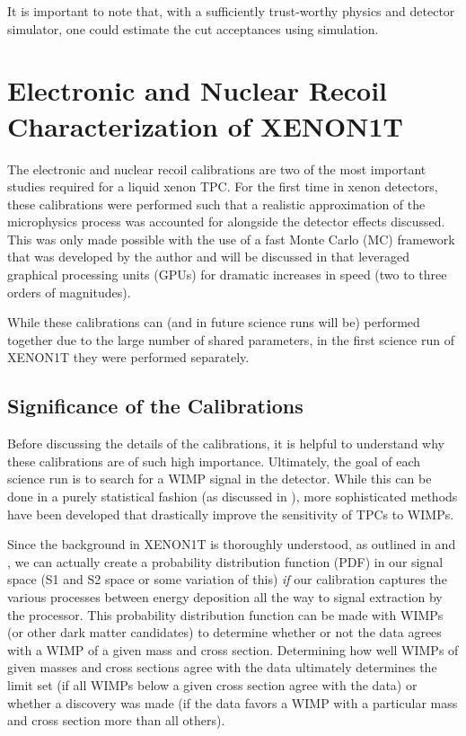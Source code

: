 It is important to note that, with a sufficiently trust-worthy physics and detector simulator, one could estimate the cut acceptances using simulation. 




\section{Electronic and Nuclear Recoil Characterization of XENON1T}
\label{sec:xe1t_er_nr_calibration}

The electronic and nuclear recoil calibrations are two of the most important studies required for a liquid xenon TPC.  For the first time in xenon detectors, these calibrations were performed such that a realistic approximation of the microphysics process was accounted for alongside the detector effects discussed.  This was only made possible with the use of a fast Monte Carlo (MC) framework that was developed by the author and will be discussed in  that leveraged graphical processing units (GPUs) for dramatic increases in speed (two to three orders of magnitudes).

While these calibrations can (and in future science runs will be) performed together due to the large number of shared parameters, in the first science run of XENON1T they were performed separately.  


\subsection{Significance of the Calibrations}

Before discussing the details of the calibrations, it is helpful to understand why these calibrations are of such high importance.  Ultimately, the goal of each science run is to search for a WIMP signal in the detector.  While this can be done in a purely statistical fashion (as discussed in ), more sophisticated methods have been developed that drastically improve the sensitivity of TPCs to WIMPs.  

Since the background in XENON1T is thoroughly understood, as outlined in  and , we can actually create a probability distribution function (PDF) in our signal space (S1 and S2 space or some variation of this) \textit{if} our calibration captures the various processes between energy deposition all the way to signal extraction by the processor.  This probability distribution function can be made with WIMPs (or other dark matter candidates) to determine whether or not the data agrees with a WIMP of a given mass and cross section.  Determining how well WIMPs of given masses and cross sections agree with the data ultimately determines the limit set (if all WIMPs below a given cross section agree with the data) or whether a discovery was made (if the data favors a WIMP with a particular mass and cross section more than all others).

